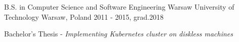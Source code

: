 

\begin{cventries}

    \cventry
    {B.S. in Computer Science and Software Engineering} %
    {Warsaw University of Technology} %
    {Warsaw, Poland} %
    {2011 - 2015, grad.2018} %
    {
        \begin{cvitems} %
            \item {Bachelor's Thesis - \em{Implementing Kubernetes cluster on diskless machines}}
        \end{cvitems}
    }

\end{cventries}
